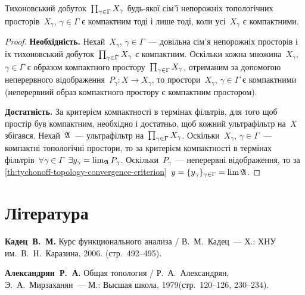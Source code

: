 \begin{theorem}
    Тихоновський добуток~$\prod_{\gamma\in\Gamma}{X}_\gamma$ будь-якої сім'ї непорожніх топологічних просторів~$X_\gamma$, $\gamma \in \Gamma$ є компактним тоді і лише тоді, коли усі~$X_\gamma$ є компактними.
\end{theorem}

\begin{proof}
    \textbf{Необхідність.} Нехай~$X_\gamma$, $\gamma \in \Gamma$~--- довільна сім'я непорожніх просторів і їх тихоновський добуток~$\prod_{\gamma\in\Gamma}{X}_\gamma$ є компактним. Оскільки кожна множина~$X_\gamma$, $\gamma \in \Gamma$ є образом компактного простору~$\prod_{\gamma\in\Gamma}{X}_\gamma$, отриманим за допомогою неперервного відображення~$P_\gamma: X \to X_\gamma$, то простори~$X_\gamma$, $\gamma \in \Gamma$ є компактними (неперервний образ компактного простору є компактним простором).

    \textbf{Достатність.} За критерієм компактності в термінах фільтрів, для того щоб простір був компактним, необхідно і достатньо, щоб кожний ультрафільтр на~$X$ збігався. Нехай~$\frak A$~--- ультрафільтр на~$\prod_{\gamma\in\Gamma}{X}_\gamma$. Оскільки~$X_\gamma$, $\gamma \in \Gamma$~--- компактні топологічні простори, то за критерієм компактності в термінах фільтрів~$\forall \gamma \in \Gamma$~$\exists y_\gamma = \lim_{\frak A} P_\gamma$. Оскільки~$P_\gamma$~--- неперервні відображення, то за \cref{th:tychonoff-topology-convergence-criterion}~$y = \{y_\gamma\}_{\gamma \in \Gamma} = \lim \frak A$.
\end{proof}

\section{Література}

\begin{enumerate}[label={[\arabic*]}]
\item \textbf{Кадец~В.~М.}
Курс функционального анализа /
В.~М.~Кадец~---
Х.: ХНУ им.~В.~Н.~Каразина, 2006. (стр.~492--495).
\item \textbf{Александрян~Р.~А.}
Общая топология /
Р.~А.~Александрян, Э.~А.~Мирзаханян~---
М.: Высшая школа, 1979(стр.~120--126, 230--234).
\end{enumerate}
